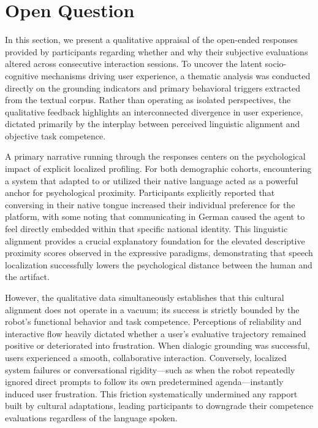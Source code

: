 \section{Open Question}
In this section, we present a qualitative appraisal of the open-ended responses provided by participants regarding whether and why their subjective evaluations altered across consecutive interaction sessions. 
To uncover the latent socio-cognitive mechanisms driving user experience, a thematic analysis was conducted directly on the grounding indicators and primary behavioral triggers extracted from the textual corpus. Rather than operating as isolated perspectives, the qualitative feedback highlights an interconnected divergence in user experience, dictated primarily by the interplay between perceived linguistic alignment and objective task competence.

A primary narrative running through the responses centers on the psychological impact of explicit localized profiling. 
For both demographic cohorts, encountering a system that adapted to or utilized their native language acted as a powerful anchor for psychological proximity. 
Participants explicitly reported that conversing in their native tongue increased their individual preference for the platform, with some noting that communicating in German caused the agent to feel directly embedded within that specific national identity. 
This linguistic alignment provides a crucial explanatory foundation for the elevated descriptive proximity scores observed in the expressive paradigms, demonstrating that speech localization successfully lowers the psychological distance between the human and the artifact.

However, the qualitative data simultaneously establishes that this cultural alignment does not operate in a vacuum; its success is strictly bounded by the robot's functional behavior and task competence. 
Perceptions of reliability and interactive flow heavily dictated whether a user's evaluative trajectory remained positive or deteriorated into frustration.
When dialogic grounding was successful, users experienced a smooth, collaborative interaction. 
Conversely, localized system failures or conversational rigidity—such as when the robot repeatedly ignored direct prompts to follow its own predetermined agenda—instantly induced user frustration. 
This friction systematically undermined any rapport built by cultural adaptations, leading participants to downgrade their competence evaluations regardless of the language spoken.


